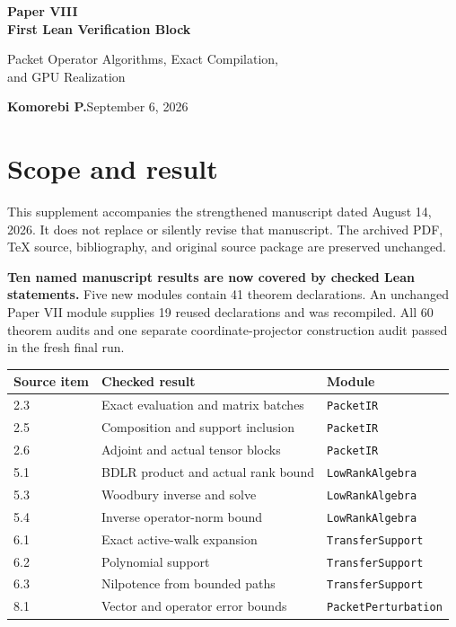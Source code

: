 \documentclass[11pt]{article}
\newcommand{\code}[1]{\texttt{\small #1}}
\begin{document}
\thispagestyle{fancy}
{\LARGE\bfseries\color{ink} Paper VIII\\[3pt] First Lean Verification Block}\par
{\large Packet Operator Algorithms, Exact Compilation,\\and GPU Realization}\par
\textbf{Komorebi P.}\hfill September 6, 2026

\section*{\color{ink}Scope and result}
This supplement accompanies the strengthened manuscript dated August 14, 2026. It does not replace or silently revise that manuscript. The archived PDF, TeX source, bibliography, and original source package are preserved unchanged.

\textbf{Ten named manuscript results are now covered by checked Lean statements.} Five new modules contain 41 theorem declarations. An unchanged Paper VII module supplies 19 reused declarations and was recompiled. All 60 theorem audits and one separate coordinate-projector construction audit passed in the fresh final run.

\begin{center}\small
\renewcommand{\arraystretch}{1.22}
\begin{tabular}{@{}p{}p{}p{}@{}}
\toprule
Source item & Checked result & Module \\
\midrule
2.3 & Exact evaluation and matrix batches & \code{PacketIR}\\
2.5 & Composition and support inclusion & \code{PacketIR}\\
2.6 & Adjoint and actual tensor blocks & \code{PacketIR}\\
5.1 & BDLR product and actual rank bound & \code{LowRankAlgebra}\\
5.3 & Woodbury inverse and solve & \code{LowRankAlgebra}\\
5.4 & Inverse operator-norm bound & \code{LowRankAlgebra}\\
6.1 & Exact active-walk expansion & \code{TransferSupport}\\
6.2 & Polynomial support & \code{TransferSupport}\\
6.3 & Nilpotence from bounded paths & \code{TransferSupport}\\
8.1 & Vector and operator error bounds & \code{PacketPerturbation}\\
\bottomrule
\end{tabular}
\end{center}
\end{document}
